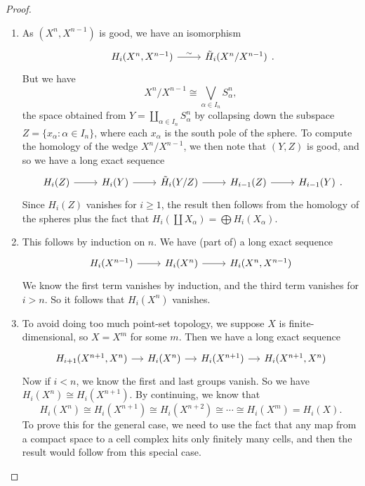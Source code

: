 \documentclass[a4paper]{article}
\begin{document}
\begin{proof}\leavevmode
  \begin{enumerate}
    \item As $(X^n, X^{n - 1})$ is good, we have an isomorphism
      \[
        \begin{tikzcd}
          H_i(X^n, X^{n - 1}) \ar[r, "\sim"] & \tilde{H}_i(X^n/X^{n - 1})
        \end{tikzcd}.
      \]
      But we have
      \[
        X^n/X^{n - 1} \cong \bigvee_{\alpha \in I_n} S_\alpha^n,
      \]
      the space obtained from $Y = \coprod_{\alpha \in I_n}S_\alpha^n$ by collapsing down the subspace $Z = \{x_\alpha: \alpha \in I_n\}$, where each $x_\alpha$ is the south pole of the sphere. To compute the homology of the wedge $X^n/X^{n - 1}$, we then note that $(Y, Z)$ is good, and so we have a long exact sequence
      \[
        \begin{tikzcd}
          H_i(Z) \ar[r] & H_i(Y) \ar[r] & \tilde{H}_i(Y/Z) \ar[r] & H_{i - 1}(Z) \ar[r] & H_{i - 1}(Y)
        \end{tikzcd}.
      \]
      Since $H_i(Z)$ vanishes for $i \geq 1$, the result then follows from the homology of the spheres plus the fact that $H_i(\coprod X_\alpha) = \bigoplus H_i(X_\alpha)$.
    \item This follows by induction on $n$. We have (part of) a long exact sequence
      \[
        \begin{tikzcd}
          H_i(X^{n - 1}) \ar[r] & H_i(X^n) \ar[r] & H_i(X^n, X^{n - 1})
        \end{tikzcd}
      \]
      We know the first term vanishes by induction, and the third term vanishes for $i > n$. So it follows that $H_i(X^n)$ vanishes.
    \item To avoid doing too much point-set topology, we suppose $X$ is finite-dimensional, so $X = X^m$ for some $m$. Then we have a long exact sequence
      \[
        \begin{tikzcd}[column sep=small]
          H_{i + 1} (X^{n + 1}, X^n) \ar[r] & H_i(X^n) \ar[r] & H_i(X^{n + 1}) \ar[r] & H_i(X^{n + 1}, X^n)
        \end{tikzcd}
      \]
      Now if $i < n$, we know the first and last groups vanish. So we have $H_i(X^n) \cong H_i(X^{n + 1})$. By continuing, we know that
      \[
        H_i(X^n) \cong H_i(X^{n + 1}) \cong H_i(X^{n + 2}) \cong \cdots \cong H_i(X^m) = H_i(X).
      \]
      To prove this for the general case, we need to use the fact that any map from a compact space to a cell complex hits only finitely many cells, and then the result would follow from this special case.
  \end{enumerate}
\end{proof}
\end{document}
